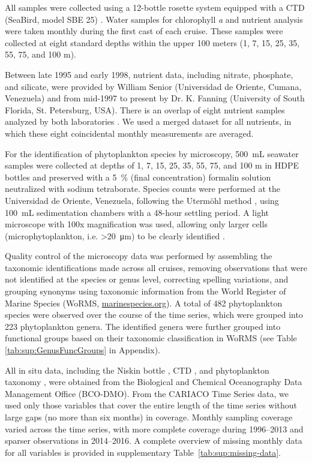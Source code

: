 \documentclass[]{agujournal2019}
\begin{document}
    All samples were collected using a 12-bottle rosette system equipped with a CTD (SeaBird, model SBE 25) \cite{astor_yrene_m_handbook_2013}. Water samples for chlorophyll \textit{a} and nutrient analysis were taken monthly during the first cast of each cruise. These samples were collected at eight standard depths within the upper 100 meters (1, 7, 15, 25, 35, 55, 75, and 100 m). 

    Between late 1995 and early 1998, nutrient data, including nitrate, phosphate, and silicate, were provided by William Senior (Universidad de Oriente, Cumana, Venezuela) and from mid-1997 to present by Dr. K. Fanning (University of South Florida, St. Petersburg, USA).  There is an overlap of eight nutrient samples analyzed by both laboratories \cite{taylor_ecosystem_2012}. We used a merged dataset for all nutrients, in which these eight coincidental monthly measurements are averaged.
       
    For the identification of phytoplankton species by microscopy, \qty{500}{\milli\liter} seawater samples were collected at depths of 1, 7, 15, 25, 35, 55, 75, and 100 m in HDPE bottles and preserved with a \qty{5}{\%} (final concentration) formalin solution neutralized with sodium tetraborate. Species counts were performed at the Universidad de Oriente, Venezuela, following the Utermöhl method \cite{hasle_inverted_1978}, using \qty{100}{\milli\liter} sedimentation chambers with a 48-hour settling period. A light microscope with 100x magnification was used, allowing only larger cells (microphytoplankton, i.e. \textgreater \qty{20}{\micro\meter}) to be clearly identified \cite{astor_yrene_m_handbook_2013}.

    Quality control of the microscopy data was performed by assembling the taxonomic identifications made across all cruises, removing observations that were not identified at the species or genus level, correcting spelling variations, and grouping synonyms using taxonomic information from the World Register of Marine Species (WoRMS, \url{marinespecies.org}). A total of 482 phytoplankton species were observed over the course of the time series, which were grouped into 223 phytoplankton genera. The identified genera were further grouped into functional groups based on their taxonomic classification in WoRMS (see Table \ref{tab:sup:GenusFuncGroups} in Appendix).
    
    All in situ data, including the Niskin bottle \cite{muller-karger_time-series_2019}, CTD \cite{muller-karger_time_2019}, and phytoplankton taxonomy \cite{troccoli_time-series_2019}, were obtained from the Biological and Chemical Oceanography Data Management Office (BCO-DMO). 
    From the CARIACO Time Series data, we used only those variables that cover the entire length of the time series without large gaps (no more than six months) in coverage. Monthly sampling coverage varied across the time series, with more complete coverage during 1996–2013 and sparser observations in 2014–2016. A complete overview of missing monthly data for all variables is provided in supplementary Table~\ref{tab:sup:missing-data}.
\end{document}

